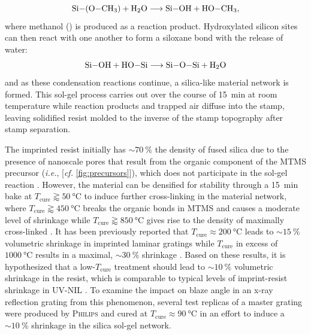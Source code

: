\begin{equation}
 \ce{Si-(O-CH3)} + \ce{H2O} \longrightarrow \ce{Si-OH} + \ce{HO-CH3} , 
 \end{equation}
where methanol () is produced as a reaction product. 
Hydroxylated silicon sites can then react with one another to form a siloxane bond with the release of water: 
\begin{equation}
 \ce{Si-OH} + \ce{HO-Si} \longrightarrow \ce{Si-O-Si} + \ce{H2O} 
 \end{equation}
and as these condensation reactions continue, a silica-like material network is formed. 
This sol-gel process carries out over the course of \SI{15}{\minute} at room temperature while reaction products and trapped air diffuse into the stamp, leaving solidified resist molded to the inverse of the stamp topography after stamp separation. 

The imprinted resist initially has $\sim \SI{70}{\percent}$ the density of fused silica due to the presence of nanoscale pores that result from the organic component of the MTMS precursor (\emph{i.e.},  [\emph{cf.\@} \cref{fig:precursors}]), which does not participate in the sol-gel reaction \cite{Verschuuren10,Verschuuren17,Verschuuren19}. 
However, the material can be densified for stability through a \SI{15}{\minute} bake at $T_{\text{cure}} \gtrapprox \SI{50}{\celsius}$ to induce further cross-linking in the material network, where $T_{\text{cure}} \gtrapprox \SI{450}{\celsius}$ breaks the organic bonds in MTMS and causes a moderate level of shrinkage while $T_{\text{cure}} \gtrapprox \SI{850}{\celsius}$ gives rise to the density of maximally cross-linked . 
It has been previously reported that $T_{\text{cure}} \approx \SI{200}{\celsius}$ leads to $\sim \SI{15}{\percent}$ volumetric shrinkage in imprinted laminar gratings while $T_{\text{cure}}$ in excess of $\SI{1000}{\celsius}$ results in a maximal, $\sim \SI{30}{\percent}$ shrinkage \cite{Verschuuren10,Verschuuren19}.   
Based on these results, it is hypothesized that a low-$T_{\text{cure}}$ treatment should lead to $\sim \SI{10}{\percent}$ volumetric shrinkage in the resist, which is comparable to typical levels of imprint-resist shrinkage in UV-NIL \cite{Schift10}. 
To examine the impact on blaze angle in an x-ray reflection grating from this phenomenon, several test replicas of a master grating were produced by \textsc{Philips} and cured at $T_{\text{cure}} \approx \SI{90}{\celsius}$ in an effort to induce a $\sim \SI{10}{\percent}$ shrinkage in the silica sol-gel network. 

